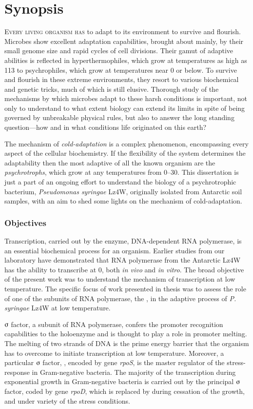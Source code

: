 \chapter{Synopsis}
\textsc{Every living organism has} to adapt to its environment to
survive and flourish. Microbes show excellent adaptation
capabilities, brought about mainly, by their small genome size and
rapid cycles of cell divisions. Their gamut of adaptive abilities
is reflected in hyperthermophiles, which grow at temperatures as
high as 113\dg{} to psychrophiles, which grow at temperatures near
0\dg{} or below. To survive and flourish in these extreme
environments, they resort to various biochemical and genetic
tricks, much of which is still elusive. Thorough study of the
mechanisms by which microbes adapt to these harsh conditions is
important, not only to understand to what extent biology can
extend its limits in spite of being governed by unbreakable
physical rules, but also to answer the long standing
question---how and in what conditions life originated on this
earth?

The mechanism of \emph{cold-adaptation} is a complex phenomenon,
encompassing every aspect of the cellular biochemistry. If the
flexibility of the system determines the adaptability then the
most adaptive of all the known organism are the
\emph{psychrotrophs}, which grow at any temperatures from
0--30\dg{}\@. This dissertation is just a part of an ongoing
effort to understand the biology of a psychrotrophic bacterium,
\emph{Pseudomonas syringae} Lz4W, originally isolated from
Antarctic soil samples, with an aim to shed some lights on the
mechanism of cold-adaptation.

\subsection*{Objectives}

Transcription, carried out by the enzyme, DNA-dependent RNA
polymerase, is an essential biochemical process for an organism.
Earlier studies from our laboratory have demonstrated that RNA
polymerase from the Antarctic  Lz4W has the ability to
transcribe at 0\dg{}, both \emph{in vivo} and \emph{in vitro}. The
broad objective of the present work was to understand the
mechanism of transcription at low temperature. The specific focus
of work presented in thesis was to assess the role of one of the
subunits of RNA polymerase, the \s{}, in the adaptive process of
\emph{P. syringae} Lz4W at low temperature.

$\sigmaup$ factor, a subunit of RNA polymerase, confers the
promoter recognition capabilities to the holoenzyme and is thought
to play a role in promoter melting. The melting of two strands of
DNA is the prime energy barrier that the organism has to overcome
to initiate transcription at low temperature. Moreover, a
particular $\sigmaup$ factor, \sigs{}, encoded by gene
\emph{rpoS}, is the master regulator of the stress-response in
Gram-negative bacteria. The majority of the transcription during
exponential growth in Gram-negative bacteria is carried out by the
principal $\sigmaup$ factor, coded by gene \emph{rpoD}, which is
replaced by \sigs{} during cessation of the growth, and under
variety of the stress conditions.

